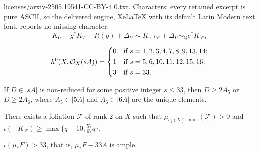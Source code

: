 \documentclass[10pt,a4paper]{amsart}
\begin{document}
licenses/arxiv-2505.19541-CC-BY-4.0.txt. Characters: every retained excerpt is pure ASCII, so the delivered engine, XeLaTeX with its default Latin Modern text font, reports no missing character.
\begin{equation}\label{eq.PullBackKF}
    K_U-g^*K_T-R(g) + \Delta_U\sim K_{e^{-1}\mathcal{F}} + \Delta_U \sim_{\mathbb{Q}} e^*K_{\mathcal{F}},
\end{equation}

    \begin{claim}\label{claim.rrfor<=33}
        \begin{equation*}
            h^0(X, \mathcal O_X(sA))=
            \begin{dcases}
            0 & \text{if } s=1,2,3,4,7,8,9,13,14; \\ %
            1 & \text{if } s=5,6,10,11,12,15,16; \\ %
            3& \text{if } s=33.
            \end{dcases}
        \end{equation*}
    \end{claim}

    \begin{claim}\label{claim.easyfact}
        If $D\in |sA|$ is non-reduced for some positive integer $s\leq 33$, then $D\geq 2A_5$ or $D\geq 2A_6$, where $A_5\in|5A|$ and $A_6\in|6A|$ are the unique elements.
    \end{claim}

    \begin{claim}\label{claim.prepare}
        There exists a foliation $\mathcal F$ of rank $2$ on $X$ such that $\mu_{c_1(X), \min}(\mathcal F)>0$ and $\iota(-K_{\mathcal F})\geq \max\{ q-10, \frac{57}{67}q\}$. 
    \end{claim}

    \begin{claim}\label{claim.mu(F)}
        $\iota(\mu_*F)>33$, that is, $\mu_*F-33A$ is ample. 
    \end{claim}
\end{document}
